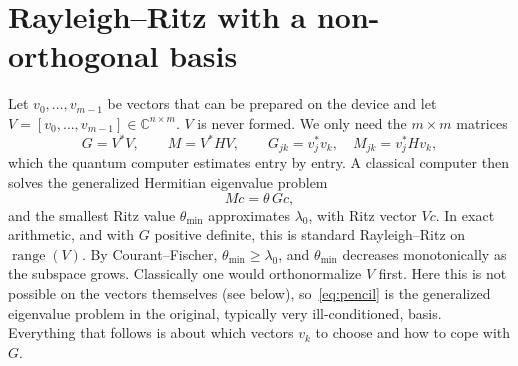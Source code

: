 \documentclass[11pt,a4paper]{article}
\newcommand{\C}{\mathbb{C}}
\begin{document}
\section{Rayleigh--Ritz with a non-orthogonal basis}\label{sec:rr}

Let $v_0,\dots,v_{m-1}$ be vectors that can be prepared on the device and
let $V = [v_0,\dots,v_{m-1}]\in\C^{n\times m}$. $V$ is never formed. We
only need the $m\times m$ matrices
\begin{equation}\label{eq:GM}
  G = V^*V,\qquad M = V^*HV,\qquad G_{jk} = v_j^*v_k,\quad M_{jk}=v_j^*Hv_k ,
\end{equation}
which the quantum computer estimates entry by entry. A classical
computer then solves the generalized Hermitian eigenvalue problem
\begin{equation}\label{eq:pencil}
  M c = \theta\, G c ,
\end{equation}
and the smallest Ritz value $\theta_{\min}$ approximates $\lambda_0$, with
Ritz vector $Vc$. In exact arithmetic, and with $G$ positive definite,
this is standard Rayleigh--Ritz on $\operatorname{range}(V)$. By
Courant--Fischer, $\theta_{\min}\ge\lambda_0$, and $\theta_{\min}$
decreases monotonically as the subspace grows. Classically one would
orthonormalize $V$ first. Here this is not possible on the vectors
themselves (see below), so~\eqref{eq:pencil} is the generalized
eigenvalue problem in the original, typically very ill-conditioned,
basis. Everything that follows is about which vectors $v_k$ to choose
and how to cope with $G$.
\end{document}
